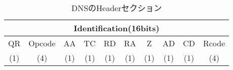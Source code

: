\begin{table}[htbp]
 \caption{DNSのHeaderセクション}
 \centering
  \begin{tabular}{|c|c|c|c|c|c|c|c|c|c|}
    \toprule
		\multicolumn{10}{|c|}{Identification(16bits)}\\
    \midrule
		QR & Opcode & AA & TC & RD & RA & Z & AD & CD & Rcode \\
		(1) & (4) & (1) & (1) & (1) & (1) & (1) & (1) & (1) & (4) \\
    \bottomrule
  \end{tabular}
 \label{tab:header-dns}
\end{table}
